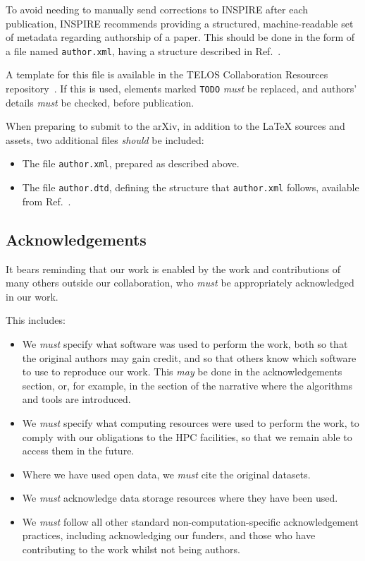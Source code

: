 \documentclass{article}
\newcommand\rfcword[1]{\emph{#1}\xspace}
\newcommand\must{\rfcword{must}}
\newcommand\should{\rfcword{should}}
\newcommand\may{\rfcword{may}}
\newcommand\filename[1]{\texttt{#1}\xspace}
\newcommand\authorxml{\filename{author.xml}\xspace}
\begin{document}
To avoid needing to manually send corrections to INSPIRE after each publication,
INSPIRE recommends providing
a structured, machine-readable set of metadata regarding authorship of a paper.
This should be done in the form of a file named \authorxml,
having a structure described in Ref.~\cite{inspire-authorxml}.

A template for this file is available in the TELOS Collaboration Resources repository~\cite{resources}.
If this is used,
elements marked \verb|TODO| \must be replaced,
and authors' details \must be checked,
before publication.

When preparing to submit to the arXiv,
in addition to the LaTeX sources and assets,
two additional files \should be included:

\begin{itemize}
  \item
        The file \authorxml,
        prepared as described above.
  \item
        The file \filename{author.dtd},
        defining the structure that \authorxml follows,
        available from Ref.~\cite{inspire-authorxml}.
\end{itemize}

\subsection{Acknowledgements}\label{sec:acknowledge}

It bears reminding that our work is enabled by
the work and contributions of many others outside our collaboration,
who \must be appropriately acknowledged in our work.

This includes:

\begin{itemize}
  \item
        We \must specify what software was used to perform the work,
        both so that the original authors may gain credit,
        and so that others know which software to use to reproduce our work.
        This \may be done in the acknowledgements section,
        or,
        for example,
        in the section of the narrative where the algorithms and tools are introduced.
  \item
        We \must specify what computing resources were used to perform the work,
        to comply with our obligations to the HPC facilities,
        so that we remain able to access them in the future.
  \item
        Where we have used open data,
        we \must cite the original datasets.
  \item
        We \must acknowledge data storage resources where they have been used.
  \item
        We \must follow all other standard non-computation-specific acknowledgement practices,
        including acknowledging our funders,
        and those who have contributing to the work whilst not being authors.
\end{itemize}
\end{document}

